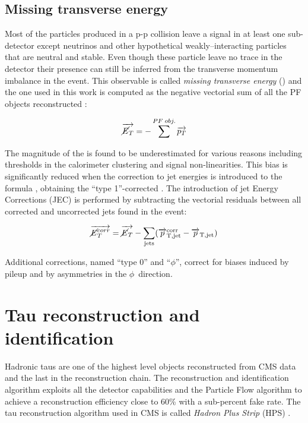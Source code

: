 \subsection{Missing transverse energy}

Most of the particles produced in a p-p collision leave a signal in at least one sub-detector except neutrinos and other hypothetical weakly--interacting particles that are neutral and stable. Even though these particle leave no trace in the detector their presence can still be inferred from the transverse momentum imbalance in the event. This observable is called \emph{missing transverse energy} (\MET) and the one used in this work is computed as the negative vectorial sum of all the PF objects reconstructed \cite{CMS-PAS-JME-13-003}: 

\begin{equation}
\vec{\cancel{E}_T} = -\sum^{PF\;obj.} \vec{p_{T}}
\end{equation}

The magnitude of the \MET is found to be underestimated for various reasons including thresholds in the calorimeter clustering and signal non-linearities. This bias is significantly reduced when the correction to jet energies is introduced to the formula \cite{Chatrchyan:2011ds}, obtaining the ``type 1''-corrected \MET. The introduction of jet Energy Corrections (JEC) is performed by subtracting the vectorial residuals between all corrected and uncorrected jets found in the event:

\begin{equation}
\vec{\cancel{E}_T^{corr}} = \vec{\cancel{E}_T } - \sum_\mathrm{jets} (\vec{p}_\mathrm{T,jet}^\mathrm{corr}-\vec{p}_\mathrm{T,jet})
\label{eq:Type1MET}
\end{equation}

Additional corrections, named ``type 0'' and ``$\phi$'', correct for biases induced by pileup and by asymmetries in the $\phi$\ direction.

\section{Tau reconstruction and identification}
\label{sec:tau_id}

Hadronic taus are one of the highest level objects reconstructed from CMS data and the last in the reconstruction chain. The reconstruction and identification algorithm exploits all the detector capabilities and the Particle Flow algorithm to achieve a reconstruction efficiency close to 60\% with a sub-percent fake rate. The tau reconstruction algorithm used in CMS is called \emph{Hadron Plus Strip} (HPS) \cite{CMS-PAS-TAU-11-001}. 

